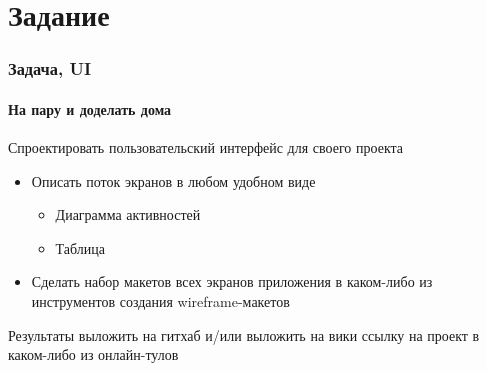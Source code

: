 \documentclass[xetex,mathserif,serif]{beamer}
\begin{document}
	\section{Задание}

	\begin{frame}
		\frametitle{Задача, UI}
		\framesubtitle{На пару и доделать дома}
		Спроектировать пользовательский интерфейс для своего проекта
		\begin{itemize} 
			\item Описать поток экранов в любом удобном виде
			\begin{itemize} 
				\item Диаграмма активностей
				\item Таблица
			\end{itemize} 
			\item Сделать набор макетов всех экранов приложения в каком-либо из инструментов создания wireframe-макетов 
		\end{itemize} 
		Результаты выложить на гитхаб и/или выложить на вики ссылку на проект в каком-либо из онлайн-тулов
	\end{frame}
\end{document}
